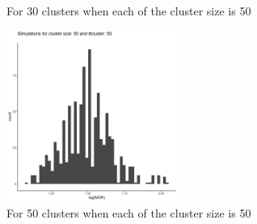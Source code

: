 \documentclass[
  letterpaper,
  DIV=11,
  numbers=noendperiod]{scrartcl}
\begin{document}
\begin{figure}
\begin{minipage}[t]{0.11\linewidth}
{\centering 

~

}

\end{minipage}%
%
\begin{minipage}[t]{0.44\linewidth}

{\centering 


\caption{For 30 clusters when each of the cluster size is 50}

}

\end{minipage}%

\end{figure}

\vspace{5mm}

\begin{figure}[H]

{\centering \includegraphics[width=0.5\textwidth,height=\textheight]{../plots/hist_50_50.png}

}

\caption{For 50 clusters when each of the cluster size is 50}

\end{figure}
\end{document}
